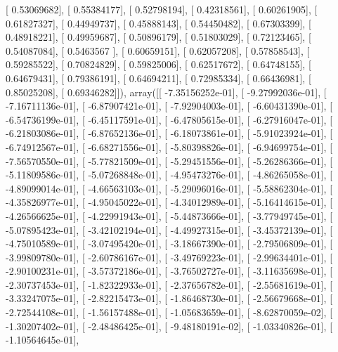 \documentclass{article}
\begin{document}
       [ 0.53069682],
       [ 0.55384177],
       [ 0.52798194],
       [ 0.42318561],
       [ 0.60261905],
       [ 0.61827327],
       [ 0.44949737],
       [ 0.45888143],
       [ 0.54450482],
       [ 0.67303399],
       [ 0.48918221],
       [ 0.49959687],
       [ 0.50896179],
       [ 0.51803029],
       [ 0.72123465],
       [ 0.54087084],
       [ 0.5463567 ],
       [ 0.60659151],
       [ 0.62057208],
       [ 0.57858543],
       [ 0.59285522],
       [ 0.70824829],
       [ 0.59825006],
       [ 0.62517672],
       [ 0.64748155],
       [ 0.64679431],
       [ 0.79386191],
       [ 0.64694211],
       [ 0.72985334],
       [ 0.66436981],
       [ 0.85025208],
       [ 0.69346282]]), array([[ -7.35156252e-01],
       [ -9.27992036e-01],
       [ -7.16711136e-01],
       [ -6.87907421e-01],
       [ -7.92904003e-01],
       [ -6.60431390e-01],
       [ -6.54736199e-01],
       [ -6.45117591e-01],
       [ -6.47805615e-01],
       [ -6.27916047e-01],
       [ -6.21803086e-01],
       [ -6.87652136e-01],
       [ -6.18073861e-01],
       [ -5.91023924e-01],
       [ -6.74912567e-01],
       [ -6.68271556e-01],
       [ -5.80398826e-01],
       [ -6.94699754e-01],
       [ -7.56570550e-01],
       [ -5.77821509e-01],
       [ -5.29451556e-01],
       [ -5.26286366e-01],
       [ -5.11809586e-01],
       [ -5.07268848e-01],
       [ -4.95473276e-01],
       [ -4.86265058e-01],
       [ -4.89099014e-01],
       [ -4.66563103e-01],
       [ -5.29096016e-01],
       [ -5.58862304e-01],
       [ -4.35826977e-01],
       [ -4.95045022e-01],
       [ -4.34012989e-01],
       [ -5.16414615e-01],
       [ -4.26566625e-01],
       [ -4.22991943e-01],
       [ -5.44873666e-01],
       [ -3.77949745e-01],
       [ -5.07895423e-01],
       [ -3.42102194e-01],
       [ -4.49927315e-01],
       [ -3.45372139e-01],
       [ -4.75010589e-01],
       [ -3.07495420e-01],
       [ -3.18667390e-01],
       [ -2.79506809e-01],
       [ -3.99809780e-01],
       [ -2.60786167e-01],
       [ -3.49769223e-01],
       [ -2.99634401e-01],
       [ -2.90100231e-01],
       [ -3.57372186e-01],
       [ -3.76502727e-01],
       [ -3.11635698e-01],
       [ -2.30737453e-01],
       [ -1.82322933e-01],
       [ -2.37656782e-01],
       [ -2.55681619e-01],
       [ -3.33247075e-01],
       [ -2.82215473e-01],
       [ -1.86468730e-01],
       [ -2.56679668e-01],
       [ -2.72544108e-01],
       [ -1.56157488e-01],
       [ -1.05683659e-01],
       [ -8.62870059e-02],
       [ -1.30207402e-01],
       [ -2.48486425e-01],
       [ -9.48180191e-02],
       [ -1.03340826e-01],
       [ -1.10564645e-01],
\end{document}
